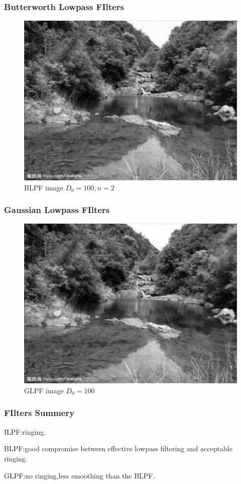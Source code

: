 \documentclass[notheorems, serif, table, compress]{beamer}  %
\begin{document}
\begin{frame}
\frametitle{Butterworth Lowpass FIlters}
\begin{figure}
 \centering
 \caption{BLPF image $D_{0}=100,n=2$}
 \includegraphics[width=0.8\linewidth]{blpf.png} 
 \end{figure}
\end{frame}

\begin{frame}
\frametitle{Gaussian Lowpass FIlters}
\begin{figure}
 \centering
 \caption{GLPF image $D_{0}=100$}
 \includegraphics[width=0.8\linewidth]{glpf.png} 
 \end{figure}
\end{frame}

\begin{frame}
\frametitle{FIlters Summery}
ILPF:ringing.%

BLPF:good compromise between effective lowpass filtering and acceptable ringing.%

GLPF:no ringing,less smoothing than the BLPF.%
\end{frame}
\end{document}

